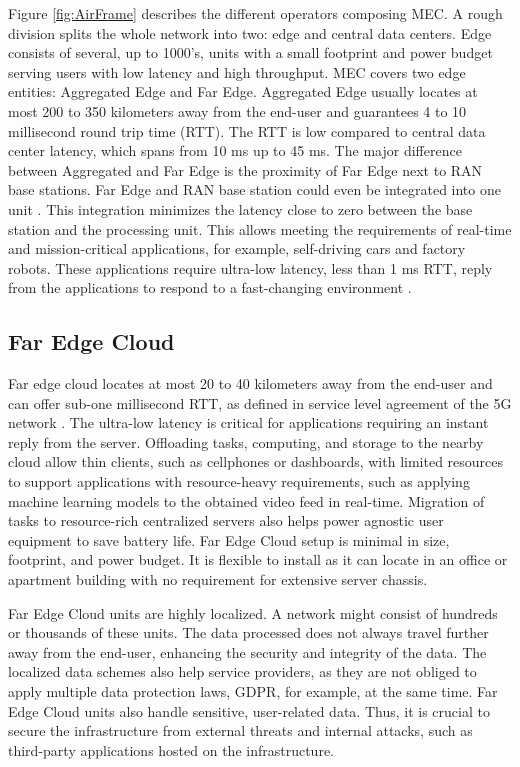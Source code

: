 Figure \ref{fig:AirFrame} describes the different operators composing MEC. A rough division splits the whole network into two: edge and central data centers. Edge consists of several, up to 1000's, units with a small footprint and power budget serving users with low latency and high throughput. MEC covers two edge entities: Aggregated Edge and Far Edge. Aggregated Edge usually locates at most 200 to 350 kilometers away from the end-user and guarantees 4 to 10 millisecond round trip time (RTT). The RTT is low compared to central data center latency, which spans from 10 ms up to 45 ms. The major difference between Aggregated and Far Edge is the proximity of Far Edge next to RAN base stations. Far Edge and RAN base station could even be integrated into one unit \cite{AirFrameOpenEdgeServer}. This integration minimizes the latency close to zero between the base station and the processing unit. This allows meeting the requirements of real-time and mission-critical applications, for example, self-driving cars and factory robots. These applications require ultra-low latency, less than 1 ms RTT, reply from the applications to respond to a fast-changing environment \cite{Ning2019}.

\subsection{Far Edge Cloud}

Far edge cloud locates at most 20 to 40 kilometers away from the end-user and can offer sub-one millisecond RTT, as defined in service level agreement of the 5G network \cite{Parvez2018}. The ultra-low latency is critical for applications requiring an instant reply from the server. Offloading tasks, computing, and storage to the nearby cloud allow thin clients, such as cellphones or dashboards, with limited resources to support applications with resource-heavy requirements, such as applying machine learning models to the obtained video feed in real-time. Migration of tasks to resource-rich centralized servers also helps power agnostic user equipment to save battery life. Far Edge Cloud setup is minimal in size, footprint, and power budget. It is flexible to install as it can locate in an office or apartment building with no requirement for extensive server chassis. \cite{AirFrameOpenEdgeServer}

Far Edge Cloud units are highly localized. A network might consist of hundreds or thousands of these units. The data processed does not always travel further away from the end-user, enhancing the security and integrity of the data. The localized data schemes also help service providers, as they are not obliged to apply multiple data protection laws, GDPR, for example, at the same time. Far Edge Cloud units also handle sensitive, user-related data. Thus, it is crucial to secure the infrastructure from external threats and internal attacks, such as third-party applications hosted on the infrastructure.

